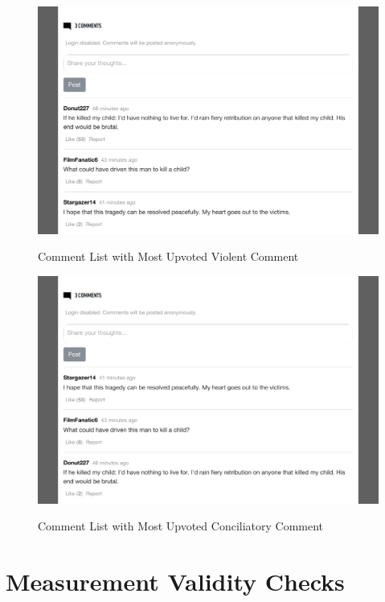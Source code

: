 \documentclass[]{article}
\begin{document}
\begin{figure}
  \centering
  \caption{Comment List with Most Upvoted Violent Comment}
  \vspace{1em}
  \includegraphics[width=.75\textwidth]{figures/comments.pdf}\\
  \label{com_vio}
\end{figure}

\begin{figure}
  \centering
  \caption{Comment List with Most Upvoted Conciliatory Comment }
  \vspace{1em}
  \includegraphics[width=.75\textwidth]{figures/comments_2.pdf}\\
  \label{com_neu}
\end{figure}

\newpage

\section{Measurement Validity Checks}
\end{document}
